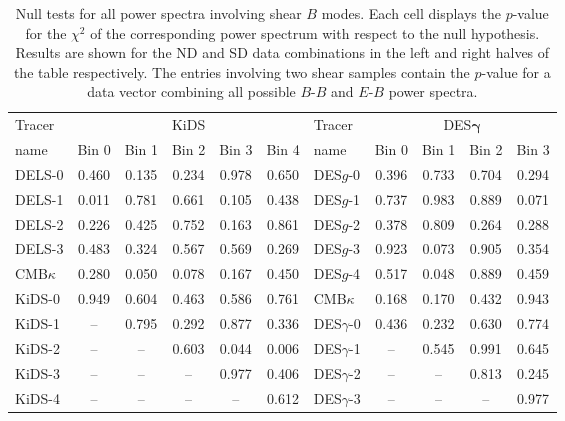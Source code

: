 \documentclass[a4paper,11pt]{article}
\newcommand{\shear}{\boldsymbol{\gamma}}
\newcommand{\cmbk}{CMB$\kappa$\xspace}
\newcommand{\des}{DES\xspace}
\newcommand{\kids}{KiDS\xspace}
\newcommand{\dls}{DELS\xspace}
\newcommand{\northd}{ND\xspace}
\newcommand{\southd}{SD\xspace}
\begin{document}
        \begin{table}[tb]
            \small
            \centering
            \begin{tabular}{|l|ccccc||l|cccc|}
                \hline
                Tracer   &\multicolumn{5}{c||}{\kids} &
                Tracer   &\multicolumn{4}{c|}{\des $\shear$}\\
                name     & Bin 0 & Bin 1 & Bin 2 & Bin 3 & Bin 4 &
                name     & Bin 0 & Bin 1 & Bin 2 & Bin 3 \\
                \hline
                \dls-0   & 0.460 & 0.135 & 0.234 & 0.978 & 0.650 & \des$g$-0 & 0.396 & 0.733 & 0.704 & 0.294 \\
                \dls-1   & 0.011 & 0.781 & 0.661 & 0.105 & 0.438 & \des$g$-1 & 0.737 & 0.983 & 0.889 & 0.071 \\
                \dls-2   & 0.226 & 0.425 & 0.752 & 0.163 & 0.861 & \des$g$-2 & 0.378 & 0.809 & 0.264 & 0.288 \\
                \dls-3   & 0.483 & 0.324 & 0.567 & 0.569 & 0.269 & \des$g$-3 & 0.923 & 0.073 & 0.905 & 0.354 \\
                \cmbk    & 0.280 & 0.050 & 0.078 & 0.167 & 0.450 & \des$g$-4 & 0.517 & 0.048 & 0.889 & 0.459 \\
                \kids-0  & 0.949 & 0.604 & 0.463 & 0.586 & 0.761 & \cmbk     & 0.168 & 0.170 & 0.432 & 0.943 \\
                \kids-1  &  --   & 0.795 & 0.292 & 0.877 & 0.336 & \des$\gamma$-0 & 0.436 & 0.232 & 0.630 & 0.774 \\
                \kids-2  &  --   &  --   & 0.603 & 0.044 & 0.006 & \des$\gamma$-1 &  --   & 0.545 & 0.991 & 0.645 \\
                \kids-3  &  --   &  --   &  --   & 0.977 & 0.406 & \des$\gamma$-2 &  --   &  --   & 0.813 & 0.245 \\
                \kids-4  &  --   &  --   &  --   &  --   & 0.612 & \des$\gamma$-3 &  --   &  --   &  --   & 0.977 \\
                \hline
            \end{tabular}
            \caption{Null tests for all power spectra involving shear $B$ modes. Each cell displays the $p$-value for the $\chi^2$ of the corresponding power spectrum with respect to the null hypothesis. Results are shown for the \northd and \southd data combinations in the left and right halves of the table respectively. The entries involving two shear samples contain the $p$-value for a data vector combining all possible $B$-$B$ and $E$-$B$ power spectra.}
            \label{tab:null_tests}
        \end{table}
  
\end{document}

